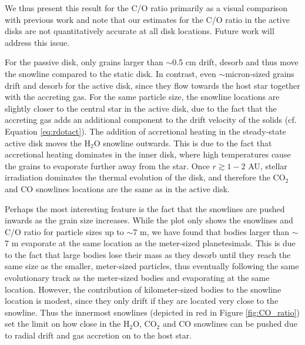 \documentclass[apj]{emulateapj}
\begin{document}
We thus present this result for the C/O ratio primarily as a visual comparison with previous work \citep{oberg11} and note that our estimates for the C/O ratio in the active disks are not quantitatively accurate at all disk locations. Future work will address this issue.   

For the passive disk, only grains larger than $\sim$0.5 cm drift, desorb and thus move the snowline compared to the static disk. In contrast, even $\sim$micron-sized grains drift and desorb for the active disk, since they flow towards the host star together with the accreting gas. For the same particle size, the snowline locations are slightly closer to the central star in the active disk, due to the fact that the accreting gas adds an additional component to the drift velocity of the solids (cf. Equation \ref{eq:rdotact}). The addition of accretional heating in the steady-state active disk moves the H$_2$O snowline outwards. This is due to the fact that accretional heating dominates in the inner disk, where high temperatures cause the grains to evaporate further away from the star. Once $r\gtrsim1-2$  AU, stellar irradiation dominates the thermal evolution of the disk, and therefore the CO$_2$ and CO snowlines locations are the same as in the active disk. 

Perhaps the most interesting feature is the fact that the snowlines are pushed inwards as the grain size increases. While the plot only shows the snowlines and C/O ratio for particle sizes up to $\sim$7 m, we have found that %
bodies larger than $\sim$7 m evaporate at the same location as the meter-sized planetesimals. This is due to the fact that large bodies lose their mass as they desorb until they reach the same size as the smaller, meter-sized particles, thus eventually following the same evolutionary track as the meter-sized bodies and evaporating at the same location. However, the contribution of kilometer-sized bodies to the snowline location is modest, since they only drift if they are located very close to the snowline.
Thus the innermost snowlines (depicted in red in Figure \ref{fig:CO_ratio}) set the limit on how close in the H$_2$O, CO$_2$ and CO snowlines can be pushed due to radial drift and gas accretion on to the host star. %
\end{document}

